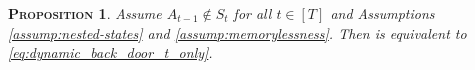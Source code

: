 \documentclass[12pt,a4paper]{article}
\newtheorem{assumption}{\normalfont\scshape Assumption}
\newtheorem{proposition}[theorem]{\normalfont\scshape  Proposition}
\theoremstyle{definition}
\begin{document}
\begin{proposition}\label{prop:dynamic_back_door_no_At_in_St}
  Assume $A_{t-1} \notin S_t$ for all $t \in [T]$ and Assumptions
  \ref{assump:nested-states} and \ref{assump:memorylessness}. Then
   is equivalent to \eqref{eq:dynamic_back_door_t_only}.
\end{proposition}

\end{document}
